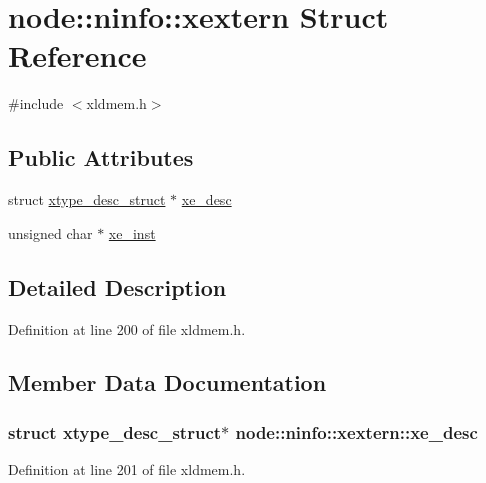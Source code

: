 \hypertarget{structnode_1_1ninfo_1_1xextern}{}\section{node\+:\+:ninfo\+:\+:xextern Struct Reference}
\label{structnode_1_1ninfo_1_1xextern}


{\ttfamily \#include $<$xldmem.\+h$>$}

\subsection*{Public Attributes}
\begin{DoxyCompactItemize}
\item 
struct \hyperlink{structxtype__desc__struct}{xtype\+\_\+desc\+\_\+struct} $\ast$ \hyperlink{structnode_1_1ninfo_1_1xextern_a640228a968d2c52df3078ecc3a573440}{xe\+\_\+desc}
\item 
unsigned char $\ast$ \hyperlink{structnode_1_1ninfo_1_1xextern_aaa686420e5a741eb456054548213a7ea}{xe\+\_\+inst}
\end{DoxyCompactItemize}


\subsection{Detailed Description}


Definition at line 200 of file xldmem.\+h.



\subsection{Member Data Documentation}
\subsubsection[{\texorpdfstring{xe\+\_\+desc}{xe_desc}}]{\setlength{\rightskip}{0pt plus 5cm}struct {\bf xtype\+\_\+desc\+\_\+struct}$\ast$ node\+::ninfo\+::xextern\+::xe\+\_\+desc}\hypertarget{structnode_1_1ninfo_1_1xextern_a640228a968d2c52df3078ecc3a573440}{}\label{structnode_1_1ninfo_1_1xextern_a640228a968d2c52df3078ecc3a573440}


Definition at line 201 of file xldmem.\+h.

